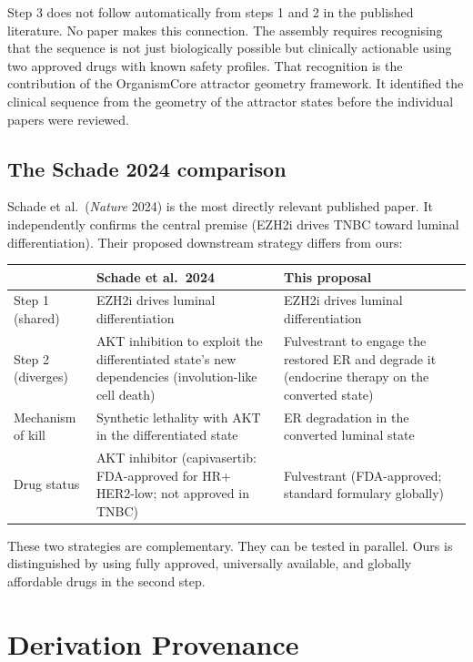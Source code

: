 \documentclass[12pt, a4paper]{article}
\begin{document}
Step 3 does not follow automatically from steps 1
and 2 in the published literature. No paper makes
this connection. The assembly requires recognising
that the sequence is not just biologically possible
but clinically actionable using two approved drugs
with known safety profiles. That recognition is the
contribution of the OrganismCore attractor geometry
framework. It identified the clinical sequence from
the geometry of the attractor states before the
individual papers were reviewed.

\subsection{The Schade 2024 comparison}

Schade et al.\ (\textit{Nature} 2024) is the most
directly relevant published paper. It independently
confirms the central premise (EZH2i drives TNBC toward
luminal differentiation). Their proposed downstream
strategy differs from ours:

\begin{center}
\begin{tabular}{p{3cm}p{5.5cm}p{5cm}}
\toprule
& \textbf{Schade et al.\ 2024} & \textbf{This proposal} \\
\midrule
Step 1 (shared)
& EZH2i drives luminal differentiation
& EZH2i drives luminal differentiation \\
Step 2 (diverges)
& AKT inhibition to exploit the
  differentiated state's new
  dependencies (involution-like
  cell death)
& Fulvestrant to engage the restored
  ER and degrade it (endocrine therapy
  on the converted state) \\
Mechanism of kill
& Synthetic lethality with AKT
  in the differentiated state
& ER degradation in the converted
  luminal state \\
Drug status
& AKT inhibitor (capivasertib:
  FDA-approved for HR+ HER2-low;
  not approved in TNBC)
& Fulvestrant (FDA-approved;
  standard formulary globally) \\
\bottomrule
\end{tabular}
\end{center}

These two strategies are complementary. They can be
tested in parallel. Ours is distinguished by using
fully approved, universally available, and
globally affordable drugs in the second step.

\section{Derivation Provenance}
\end{document}
